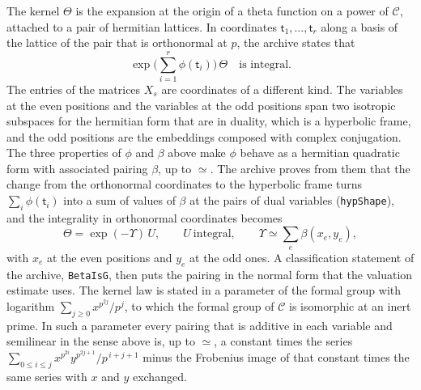 \documentclass[11pt,letterpaper]{article}
\numberwithin{equation}{section}
\begin{document}
The kernel $\Theta$ is the expansion at the origin of a theta function on a power of $\mathcal C$, attached to a pair of hermitian lattices. In coordinates $\mathsf t_1,\dots,\mathsf t_r$ along a basis of the lattice of the pair that is orthonormal at $p$, the archive states that
\[
\exp\Big(\sum_{i=1}^r\phi(\mathsf t_i)\Big)\,\Theta\quad\text{is integral.}
\]
The entries of the matrices $X_s$ are coordinates of a different kind. The variables at the even positions and the variables at the odd positions span two isotropic subspaces for the hermitian form that are in duality, which is a hyperbolic frame, and the odd positions are the embeddings composed with complex conjugation. The three properties of $\phi$ and $\beta$ above make $\phi$ behave as a hermitian quadratic form with associated pairing $\beta$, up to $\simeq$. The archive proves from them that the change from the orthonormal coordinates to the hyperbolic frame turns $\sum_i\phi(\mathsf t_i)$ into a sum of values of $\beta$ at the pairs of dual variables (\texttt{hypShape}), and the integrality in orthonormal coordinates becomes
\[
\Theta=\exp(-\Upsilon)\,U,\qquad U\ \text{integral},\qquad\Upsilon\simeq\sum_e\beta(x_e,y_e),
\]
with $x_e$ at the even positions and $y_e$ at the odd ones. A classification statement of the archive, \texttt{BetaIsG}, then puts the pairing in the normal form that the valuation estimate uses. The kernel law is stated in a parameter of the formal group with logarithm $\sum_{j\ge0}x^{p^{2j}}/p^j$, to which the formal group of $\mathcal C$ is isomorphic at an inert prime. In such a parameter every pairing that is additive in each variable and semilinear in the sense above is, up to $\simeq$, a constant times the series $\sum_{0\le i\le j}x^{p^{2i}}y^{p^{2j+1}}/p^{\,i+j+1}$ minus the Frobenius image of that constant times the same series with $x$ and $y$ exchanged.
\end{document}
